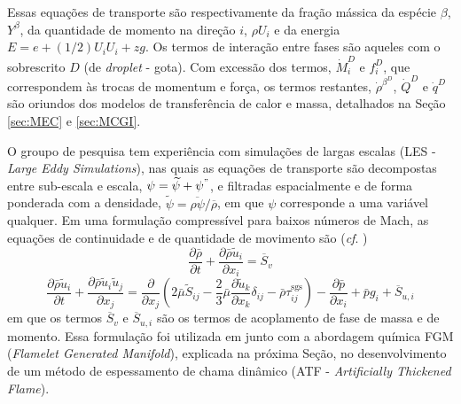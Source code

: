 Essas equações de transporte são respectivamente da fração mássica da espécie $\beta$, $Y^\beta$, da quantidade de momento na direção $i$, $\rho U_i$ e da energia $E=e+(1/2)U_iU_i+zg$. 
Os termos de interação entre fases são aqueles com o sobrescrito $D$ (de \emph{droplet} - gota).
Com excessão dos termos, $\dot M_i^D$ e $f_i^D$, que correspondem às trocas de momentum e força, os termos restantes, $\dot \rho^{\beta^D}$, $\dot Q^D$ e $\dot q^D$ são oriundos dos modelos de transferência de calor e massa, detalhados na Seção \ref{sec:MEC} e \ref{sec:MCGI}. 

O groupo de pesquisa tem experiência com simulações de largas escalas (LES - \emph{Large Eddy Simulations}), nas quais as equações de transporte são decompostas entre sub-escala e escala, $\psi = \widetilde\psi + \psi^"$, e filtradas espacialmente e de forma ponderada com a densidade, $\widetilde\psi = \overline{\rho\psi}/\overline\rho$, em que $\psi$ corresponde a uma variável qualquer. 
Em uma formulação compressível para baixos números de Mach, as equações de continuidade e de quantidade de movimento são (\emph{cf}. \cite{SacomanoF2017CF})
\begin{equation}
\frac{\partial \bar \rho}{\partial t} + 
\frac{\partial \bar \rho \widetilde u_i}{\partial x_i} = 
\overline S_v
\end{equation}
\begin{equation}
\frac{\partial \bar\rho \widetilde u_i}{\partial t} + 
\frac{\partial \bar\rho \widetilde u_i \widetilde u_j}{\partial x_j} =
\frac{\partial }{\partial x_j} \left(
	2\bar\mu \widetilde S_{ij} -
	\frac{2}{3}\bar\mu \frac{\partial \widetilde u_k}{\partial x_k} \delta_{ij} -
	\bar\rho \tau_{ij}^{\text{sgs}}
\right) -
\frac{\partial \bar p}{\partial x_i} +
\bar p g_i + 
\overline S_{u,i}
\end{equation}
em que os termos $\overline S_v$ e $\overline S_{u,i}$ são os termos de acoplamento de fase de massa e de momento.
Essa formulação foi utilizada em \cite{SacomanoF2017PhD, SacomanoF2017CF, SacomanoF2020CF} junto com a abordagem química FGM (\emph{Flamelet Generated Manifold}), explicada na próxima Seção, no desenvolvimento de um método de espessamento de chama dinâmico (ATF - \emph{Artificially Thickened Flame}).

